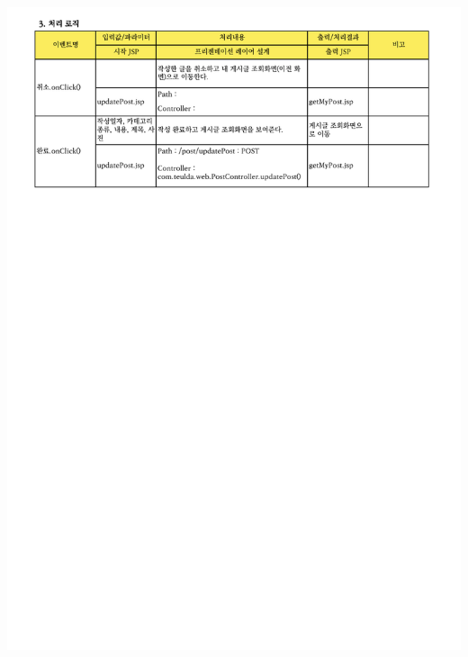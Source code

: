 {{{{{{{{{{{{{{{{{{{{{{{{{{{{{{{{{{{{{{{{{{{{{{{{{{{{{{{{{{{{{{\includegraphics[width=20cm]{./Figure/Design/Display/post/post_10.pdf} \\
}}}}}}}}}}}}}}}}}}}}}}}}}}}}}}}}}}}}}}}}}}}}}}}}}}}}}}}}}}}}}}
